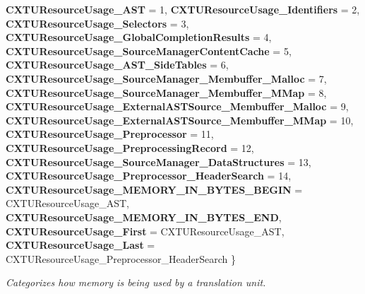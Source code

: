 \begin{DoxyCompactItemize}
{\bfseries C\+X\+T\+U\+Resource\+Usage\+\_\+\+A\+ST} = 1, 
{\bfseries C\+X\+T\+U\+Resource\+Usage\+\_\+\+Identifiers} = 2, 
{\bfseries C\+X\+T\+U\+Resource\+Usage\+\_\+\+Selectors} = 3, 
{\bfseries C\+X\+T\+U\+Resource\+Usage\+\_\+\+Global\+Completion\+Results} = 4, 
\newline
{\bfseries C\+X\+T\+U\+Resource\+Usage\+\_\+\+Source\+Manager\+Content\+Cache} = 5, 
{\bfseries C\+X\+T\+U\+Resource\+Usage\+\_\+\+A\+S\+T\+\_\+\+Side\+Tables} = 6, 
{\bfseries C\+X\+T\+U\+Resource\+Usage\+\_\+\+Source\+Manager\+\_\+\+Membuffer\+\_\+\+Malloc} = 7, 
{\bfseries C\+X\+T\+U\+Resource\+Usage\+\_\+\+Source\+Manager\+\_\+\+Membuffer\+\_\+\+M\+Map} = 8, 
\newline
{\bfseries C\+X\+T\+U\+Resource\+Usage\+\_\+\+External\+A\+S\+T\+Source\+\_\+\+Membuffer\+\_\+\+Malloc} = 9, 
{\bfseries C\+X\+T\+U\+Resource\+Usage\+\_\+\+External\+A\+S\+T\+Source\+\_\+\+Membuffer\+\_\+\+M\+Map} = 10, 
{\bfseries C\+X\+T\+U\+Resource\+Usage\+\_\+\+Preprocessor} = 11, 
{\bfseries C\+X\+T\+U\+Resource\+Usage\+\_\+\+Preprocessing\+Record} = 12, 
\newline
{\bfseries C\+X\+T\+U\+Resource\+Usage\+\_\+\+Source\+Manager\+\_\+\+Data\+Structures} = 13, 
{\bfseries C\+X\+T\+U\+Resource\+Usage\+\_\+\+Preprocessor\+\_\+\+Header\+Search} = 14, 
{\bfseries C\+X\+T\+U\+Resource\+Usage\+\_\+\+M\+E\+M\+O\+R\+Y\+\_\+\+I\+N\+\_\+\+B\+Y\+T\+E\+S\+\_\+\+B\+E\+G\+IN} = C\+X\+T\+U\+Resource\+Usage\+\_\+\+A\+ST, 
{\bfseries C\+X\+T\+U\+Resource\+Usage\+\_\+\+M\+E\+M\+O\+R\+Y\+\_\+\+I\+N\+\_\+\+B\+Y\+T\+E\+S\+\_\+\+E\+ND}, 
\newline
{\bfseries C\+X\+T\+U\+Resource\+Usage\+\_\+\+First} = C\+X\+T\+U\+Resource\+Usage\+\_\+\+A\+ST, 
{\bfseries C\+X\+T\+U\+Resource\+Usage\+\_\+\+Last} = C\+X\+T\+U\+Resource\+Usage\+\_\+\+Preprocessor\+\_\+\+Header\+Search
 \}\begin{DoxyCompactList}\small\item\em Categorizes how memory is being used by a translation unit. \end{DoxyCompactList}
\end{DoxyCompactItemize}
